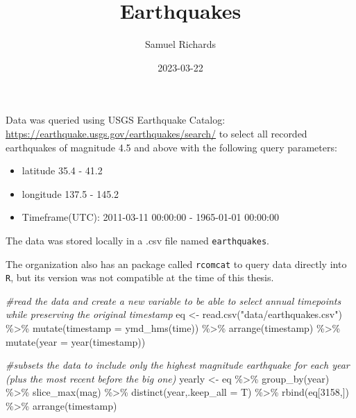 \documentclass[
]{article}
\title{Earthquakes}
\author{Samuel Richards}
\date{2023-03-22}
\newenvironment{Shaded}{\begin{snugshade}}{\end{snugshade}}
\newcommand{\AttributeTok}[1]{\textcolor[rgb]{0.77,0.63,0.00}{#1}}
\newcommand{\CommentTok}[1]{\textcolor[rgb]{0.56,0.35,0.01}{\textit{#1}}}
\newcommand{\DecValTok}[1]{\textcolor[rgb]{0.00,0.00,0.81}{#1}}
\newcommand{\FunctionTok}[1]{\textcolor[rgb]{0.00,0.00,0.00}{#1}}
\newcommand{\NormalTok}[1]{#1}
\newcommand{\OtherTok}[1]{\textcolor[rgb]{0.56,0.35,0.01}{#1}}
\newcommand{\SpecialCharTok}[1]{\textcolor[rgb]{0.00,0.00,0.00}{#1}}
\newcommand{\StringTok}[1]{\textcolor[rgb]{0.31,0.60,0.02}{#1}}
\providecommand{\tightlist}{%
  \setlength{\itemsep}{0pt}\setlength{\parskip}{0pt}}
\begin{document}
\maketitle

Data was queried using USGS Earthquake Catalog:
\url{https://earthquake.usgs.gov/earthquakes/search/} to select all
recorded earthquakes of magnitude 4.5 and above with the following query
parameters:

\begin{itemize}
\tightlist
\item
  latitude 35.4 - 41.2
\item
  longitude 137.5 - 145.2
\item
  Timeframe(UTC): 2011-03-11 00:00:00 - 1965-01-01 00:00:00
\end{itemize}

The data was stored locally in a .csv file named \texttt{earthquakes}.

The organization also has an package called \texttt{rcomcat} to query
data directly into \texttt{R}, but its version was not compatible at the
time of this thesis.

\begin{Shaded}
\begin{Highlighting}[]
\CommentTok{\#read the data and create a new variable to be able to select annual timepoints while preserving the original timestamp}
\NormalTok{eq }\OtherTok{\textless{}{-}} \FunctionTok{read.csv}\NormalTok{(}\StringTok{"data/earthquakes.csv"}\NormalTok{) }\SpecialCharTok{\%\textgreater{}\%} 
  \FunctionTok{mutate}\NormalTok{(}\AttributeTok{timestamp =} \FunctionTok{ymd\_hms}\NormalTok{(time)) }\SpecialCharTok{\%\textgreater{}\%} 
  \FunctionTok{arrange}\NormalTok{(timestamp) }\SpecialCharTok{\%\textgreater{}\%} 
  \FunctionTok{mutate}\NormalTok{(}\AttributeTok{year =} \FunctionTok{year}\NormalTok{(timestamp))}


\CommentTok{\#subsets the data to include only the highest magnitude earthquake for each year (plus the most recent before the big one)}
\NormalTok{yearly }\OtherTok{\textless{}{-}}\NormalTok{ eq }\SpecialCharTok{\%\textgreater{}\%} \FunctionTok{group\_by}\NormalTok{(year) }\SpecialCharTok{\%\textgreater{}\%} 
  \FunctionTok{slice\_max}\NormalTok{(mag) }\SpecialCharTok{\%\textgreater{}\%} 
  \FunctionTok{distinct}\NormalTok{(year,}\AttributeTok{.keep\_all =}\NormalTok{ T) }\SpecialCharTok{\%\textgreater{}\%} 
  \FunctionTok{rbind}\NormalTok{(eq[}\DecValTok{3158}\NormalTok{,]) }\SpecialCharTok{\%\textgreater{}\%} 
  \FunctionTok{arrange}\NormalTok{(timestamp)}
\end{Highlighting}
\end{Shaded}
\end{document}
